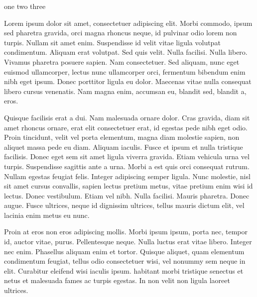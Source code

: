 \documentclass[a5paper]{book}
\begin{document}
\frontmatter
one
\clearpage
two
\clearpage
three
\clearpage
\mainmatter
{}

\beginnumbering
\pstart
Lorem ipsum dolor sit amet, consectetuer adipiscing elit. Morbi commodo, ipsum sed pharetra gravida, orci magna rhoncus neque, id pulvinar odio lorem non turpis. Nullam sit amet enim. Suspendisse id velit vitae ligula volutpat condimentum. Aliquam erat volutpat. Sed quis velit. Nulla facilisi. Nulla libero. Vivamus pharetra posuere sapien. Nam consectetuer. Sed aliquam, nunc eget euismod ullamcorper, lectus nunc ullamcorper orci, fermentum bibendum enim nibh eget ipsum. Donec porttitor ligula eu dolor. Maecenas vitae nulla consequat libero cursus venenatis. Nam magna enim, accumsan eu, blandit sed, blandit a, eros.

Quisque facilisis erat a dui. Nam malesuada ornare dolor. Cras gravida, diam sit amet rhoncus ornare, erat elit consectetuer erat, id egestas pede nibh eget odio. Proin tincidunt, velit vel porta elementum, magna diam molestie sapien, non aliquet massa pede eu diam. Aliquam iaculis. Fusce et ipsum et nulla tristique facilisis. Donec eget sem sit amet ligula viverra gravida. Etiam vehicula urna vel turpis. Suspendisse sagittis ante a urna. Morbi a est quis orci consequat rutrum. Nullam egestas feugiat felis. Integer adipiscing semper ligula. Nunc molestie, nisl sit amet cursus convallis, sapien lectus pretium metus, vitae pretium enim wisi id lectus. Donec vestibulum. Etiam vel nibh. Nulla facilisi. Mauris pharetra. Donec augue. Fusce ultrices, neque id dignissim ultrices, tellus mauris dictum elit, vel lacinia enim metus eu nunc.

Proin at eros non eros adipiscing mollis. %
 Morbi ipsum ipsum, porta nec, tempor id, auctor vitae, purus. Pellentesque neque. Nulla luctus erat vitae libero. Integer nec enim. Phasellus aliquam enim et tortor. Quisque aliquet, quam elementum condimentum feugiat, tellus odio consectetuer wisi, vel nonummy sem neque in elit. Curabitur eleifend wisi iaculis ipsum. %
 habitant morbi tristique senectus et netus et malesuada fames ac turpis egestas. In non velit non ligula laoreet ultrices.
\pend
\endnumbering

\end{document}

